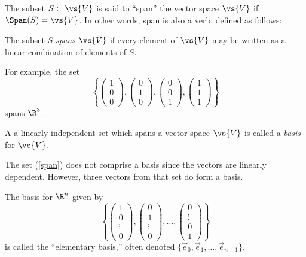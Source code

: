 The subset $S \subset \vs{V}$ is said to ``span'' the vector space
$\vs{V}$ if $\Span(S)= \vs{V}$.  In other words, span is also a verb, defined as
follows: 
\begin{definition}[Span, v.]
The subset $S$ %
\emph{spans} $\vs{V}$ if every element of $\vs{V}$ may
be written as a linear combination of elements of $S$.
\end{definition}
For example, the set 
\begin{equation}
\label{span}
\left\{
\begin{pmatrix}1 \\ 0 \\ 0\end{pmatrix},
\begin{pmatrix}0 \\ 1 \\ 0\end{pmatrix},
\begin{pmatrix}0 \\ 0 \\ 1\end{pmatrix},
\begin{pmatrix}1 \\ 1 \\ 1\end{pmatrix}
\right\}
\end{equation}
spans $\R^3$.  
\begin{definition}[Basis]
A a linearly independent set which spans a vector space $\vs{V}$ is called
a \emph{basis} for $\vs{V}$.
\end{definition}
The set (\ref{span}) does not comprise a basis since the vectors are
linearly dependent.  However, three vectors from that set do form a basis.  

The basis for $\R^n$ given by
\begin{equation}
\label{elementary}
\left\{
\begin{pmatrix}1 \\ 0 \\ \vdots \\ 0\end{pmatrix}, 
\begin{pmatrix}0 \\ 1 \\ \vdots \\ 0\end{pmatrix}, \ldots,
\begin{pmatrix}0 \\ \vdots \\ 0 \\ 1\end{pmatrix}
\right\}
\end{equation}
is called the ``elementary basis,'' often denoted $\{\vec{e}_0, \vec{e}_1,
\ldots, \vec{e}_{n-1}\}$.

